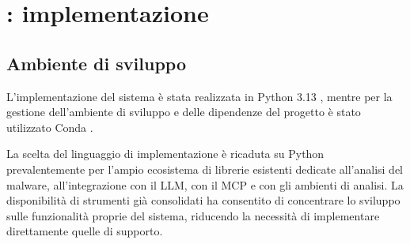 \makeatletter
\@openrightfalse
\chapter{\system{}: implementazione} \label{chap:implementazione} %
\@openrighttrue
\makeatother




\section{Ambiente di sviluppo} %

L'implementazione del sistema è stata realizzata in Python 3.13 \cite{python2026py313}, mentre per la gestione dell'ambiente di sviluppo e delle dipendenze del progetto è stato utilizzato Conda \cite{conda2026env}.

La scelta del linguaggio di implementazione è ricaduta su Python prevalentemente per l'ampio ecosistema di librerie esistenti dedicate all'analisi del malware, all'integrazione con il LLM, con il MCP e con gli ambienti di analisi. La disponibilità di strumenti già consolidati ha consentito di concentrare lo sviluppo sulle funzionalità proprie del sistema, riducendo la necessità di implementare direttamente quelle di supporto.


